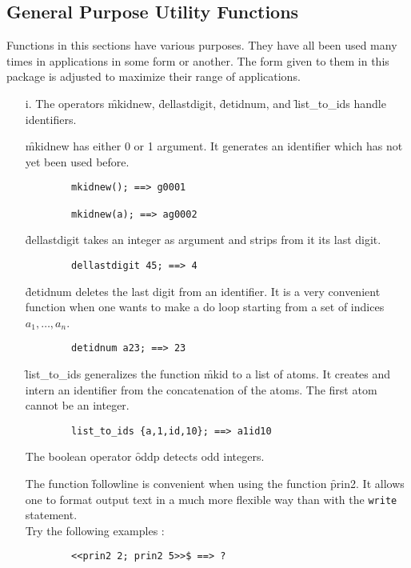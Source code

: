 \subsection{General Purpose Utility Functions}
Functions in this sections have various purposes. They have all been used
many times in applications in some form or another. The form given
to them in this package is adjusted to maximize their range of applications.
\begin{itemize}
\item[i.]
\hypertarget{operator:MKIDNEW}{}
\hypertarget{operator:DELLASTDIGIT}{}
\hypertarget{operator:DETIDNUM}{}
\hypertarget{operator:LIST_TO_IDS}{}
The operators \f{mkidnew}, \f{dellastdigit}, \f{detidnum}, and \f{list\_to\_ids}
handle identifiers. 

\f{mkidnew} has either 0 or 1 argument. 
It generates an identifier which has not yet been used before.
\begin{verbatim}
        mkidnew(); ==> g0001

        mkidnew(a); ==> ag0002
\end{verbatim}
\f{dellastdigit} takes an integer as argument and strips from it its last
digit.
\begin{verbatim}
        dellastdigit 45; ==> 4
\end{verbatim}
\f{detidnum} deletes the last digit from an
identifier. It is a very convenient function when one wants to make a do
loop starting from a set of indices $ a_1, \ldots , a_{n} $.
\begin{verbatim}
        detidnum a23; ==> 23
\end{verbatim}

\f{list\_to\_ids} generalizes the function \f{mkid} to a list of
atoms. It creates and intern an identifier from the concatenation of
the atoms. The first atom cannot be an integer.
\begin{verbatim}
        list_to_ids {a,1,id,10}; ==> a1id10
\end{verbatim}
\hypertarget{operator:ODDP}{}
The boolean operator \f{oddp}  detects odd integers.

\hypertarget{operator:FOLLOWLINE}{}
The function \f{followline} is convenient when using the function \f{prin2}.
It allows one to format output text in a much more flexible way than with
the \texttt{write} statement. \\
Try the following examples :
\begin{verbatim}
        <<prin2 2; prin2 5>>$ ==> ?


\end{verbatim}
\end{itemize}
